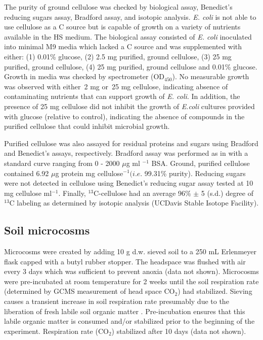 \documentclass{article}
\begin{document}
The purity of ground cellulose was checked by biological assay, Benedict's
reducing sugars assay, Bradford assay, and isotopic analysis. \textit{E. coli}
is not able to use cellulose as a C source but is capable of growth on
a variety of nutrients available in the HS medium. The biological assay
consisted of \textit{E. coli} inoculated into minimal M9 media which lacked
a C source and was supplemented with either: (1) 0.01\% glucose, (2) 2.5 mg
purified, ground cellulose, (3) 25 mg purified, ground cellulose, (4) 25 mg
purified, ground cellulose and 0.01\% glucose. Growth in media was checked by
spectrometer (OD$_{450}$). No measurable growth was observed with either~2 mg
or~25 mg cellulose, indicating absence of contaminating nutrients that can
support growth of \textit{E. coli}. In addition, the presence of 25 mg
cellulose did not inhibit the growth of \textit{E.coli} cultures provided with
glucose (relative to control), indicating the absence of compounds in the
purified cellulose that could inhibit microbial growth.

Purified cellulose was also assayed for residual proteins and sugars using
Bradford and Benedict's assays, respectively. Bradford assay was performed as
in \citep{Bradford_1976} with a standard curve ranging from 0 - 2000 $\mu$g ml
$^{-1}$ BSA. Ground, purified cellulose contained 6.92 $\mu$g protein mg
cellulose$^{-1} (\textit{i.e.}$ 99.31\% purity). Reducing sugars were not
detected in cellulose using Benedict's reducing sugar assay
\citep{benedict1909reagent} tested at 10 mg cellulose ml$^{-1}$. Finally,
$^{13}$C-cellulose had an average 96\% $\pm$
5 (s.d.) degree of $^{13}$C labeling as determined by isotopic analysis
  (UCDavis Stable Isotope Facility).           

\subsection{Soil microcosms}
Microcosms were created by adding 10 g d.w. sieved soil to a 250 mL
Erlenmeyer flask capped with a butyl rubber stopper. The headspace was flushed
with air every 3 days which was sufficient to prevent anoxia (data not shown).
Microcosms were pre-incubated at room temperature for 2 weeks until the soil
respiration rate (determined by GCMS measurement of head space CO$_{2}$) had
stabilized. Sieving causes a transient increase in soil respiration rate
presumably due to the liberation of fresh labile soil organic matter
\citep{Datta_2014}. Pre-incubation ensures that this labile organic matter is
consumed and/or stabilized prior to the beginning of the experiment.
Respiration rate (CO$_{2}$) stabilized after 10 days (data not shown). 
\end{document}
